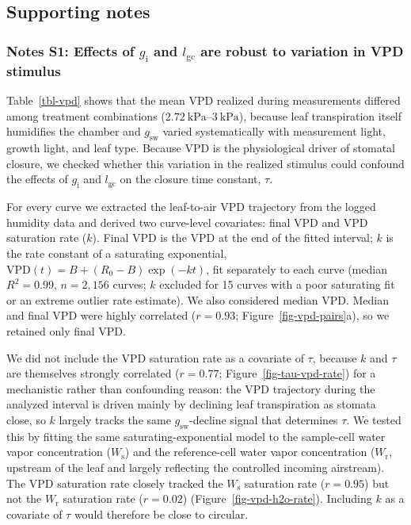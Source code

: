 \documentclass[
  letterpaper,
  DIV=11,
  numbers=noendperiod]{scrartcl}
\newcommand{\gcl}{$l_\mathrm{gc}$}
\newcommand{\gi}{$g_\mathrm{i}$}
\newcommand{\gsw}{$g_\mathrm{sw}$}
\begin{document}
\clearpage

\newpage{}

\subsection{Supporting notes}\label{supporting-notes}

\subsubsection{\texorpdfstring{Notes S1: Effects of \gi{} and \gcl{} are
robust to variation in VPD
stimulus}{Notes S1: Effects of  and  are robust to variation in VPD stimulus}}\label{notes-s1-effects-of-and-are-robust-to-variation-in-vpd-stimulus}

Table~\ref{tbl-vpd} shows that the mean VPD realized during measurements
differed among treatment combinations
(\(\SI{2.72}{\kPa}\)--\(\SI{3}{\kPa}\)), because leaf transpiration
itself humidifies the chamber and \gsw{} varied systematically with
measurement light, growth light, and leaf type. Because VPD is the
physiological driver of stomatal closure, we checked whether this
variation in the realized stimulus could confound the effects of \gi{}
and \gcl{} on the closure time constant, \(\tau\).

For every curve we extracted the leaf-to-air VPD trajectory from the
logged humidity data and derived two curve-level covariates: final VPD
and VPD saturation rate (\(k\)). Final VPD is the VPD at the end of the
fitted interval; \(k\) is the rate constant of a saturating exponential,
\(\mathrm{VPD}(t) = B + (R_0 - B)\exp(-kt)\), fit separately to each
curve (median \(R^2 = 0.99\), \(n = 2,156\) curves; \(k\) excluded for
15 curves with a poor saturating fit or an extreme outlier rate
estimate). We also considered median VPD. Median and final VPD were
highly correlated (\(r = 0.93\); Figure~\ref{fig-vpd-pairs}a), so we
retained only final VPD.

We did not include the VPD saturation rate as a covariate of \(\tau\),
because \(k\) and \(\tau\) are themselves strongly correlated
(\(r = 0.77\); Figure~\ref{fig-tau-vpd-rate}) for a mechanistic rather
than confounding reason: the VPD trajectory during the analyzed interval
is driven mainly by declining leaf transpiration as stomata close, so
\(k\) largely tracks the same \gsw{}-decline signal that determines
\(\tau\). We tested this by fitting the same saturating-exponential
model to the sample-cell water vapor concentration (\(W_\mathrm{s}\))
and the reference-cell water vapor concentration (\(W_\mathrm{r}\),
upstream of the leaf and largely reflecting the controlled incoming
airstream). The VPD saturation rate closely tracked the \(W_\mathrm{s}\)
saturation rate (\(r = 0.95\)) but not the \(W_\mathrm{r}\) saturation
rate (\(r = 0.02\)) (Figure~\ref{fig-vpd-h2o-rate}). Including \(k\) as
a covariate of \(\tau\) would therefore be close to circular.
\end{document}
